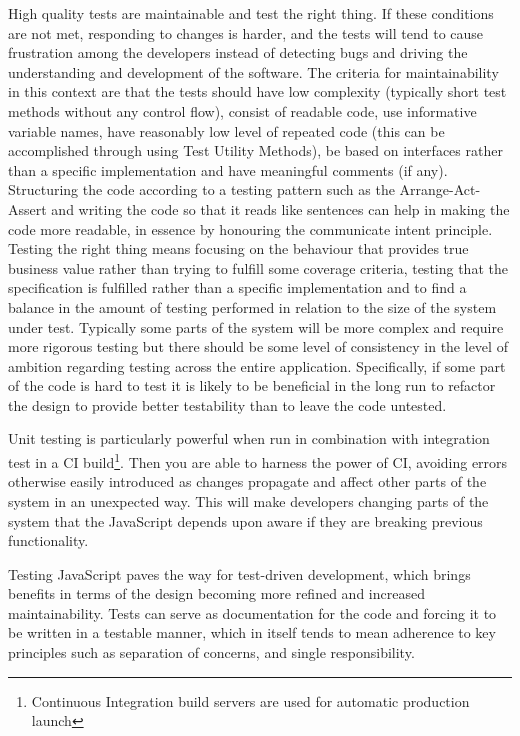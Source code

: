 \documentclass[11pt]{article}
\begin{document}
High quality tests are maintainable and test the right thing. If these conditions are not met, responding to changes is harder, and the tests will tend to cause frustration among the developers instead of detecting bugs and driving the understanding and development of the software\cite{Clean}. The criteria for maintainability in this context are that the tests should have low complexity (typically short test methods without any control flow), consist of readable code, use informative variable names, have reasonably low level of repeated code (this can be accomplished through using Test Utility Methods\cite[599]{TestPatterns}), be based on interfaces rather than a specific implementation and have meaningful comments (if any). Structuring the code according to a testing pattern such as the Arrange-Act-Assert\cite{C2} and writing the code so that it reads like sentences can help in making the code more readable, in essence by honouring the communicate intent principle\cite[p.~41]{TestPatterns}. Testing the right thing means focusing on the behaviour that provides true business value rather than trying to fulfill some coverage criteria, testing that the specification is fulfilled rather than a specific implementation and to find a balance in the amount of testing performed in relation to the size of the system under test. Typically some parts of the system will be more complex and require more rigorous testing but there should be some level of consistency in the level of ambition regarding testing across the entire application. Specifically, if some part of the code is hard to test it is likely to be beneficial in the long run to refactor the design to provide better testability than to leave the code untested.

Unit testing is particularly powerful when run in combination with integration test in a CI build\footnote{Continuous Integration build servers are used for automatic production launch}. Then you are able to harness the power of CI, avoiding errors otherwise easily introduced as changes propagate and affect other parts of the system in an unexpected way. This will make developers changing parts of the system that the JavaScript depends upon aware if they are breaking previous functionality.

Testing JavaScript paves the way for test-driven development, which brings benefits in terms of the design becoming more refined and increased maintainability. Tests can serve as documentation for the code and forcing it to be written in a testable manner, which in itself tends to mean adherence to key principles such as separation of concerns, and single responsibility.
\end{document}
